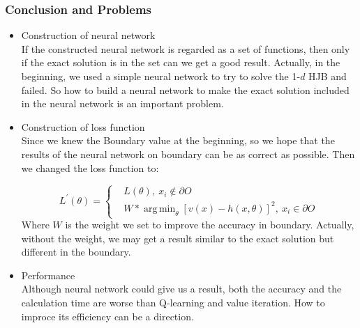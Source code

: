 \documentclass[11pt]{amsart}
\DeclareMathOperator*{\argminA}{arg\,min} %
\begin{document}
\subsubsection{Conclusion and Problems}
\begin{itemize}
 \item Construction of neural network\\
If the constructed neural network is regarded as a set of functions, then only if the exact solution is in the set can we get a good result. Actually, in the beginning, we used a simple neural network to try to solve the 1-$d$ HJB and failed. So how to build a neural network to make the exact solution included in the neural network is an important problem.
 \item Construction of loss function\\
Since we knew the Boundary value at the beginning, so we hope that the results of the neural network on boundary can be as correct as possible. Then we changed the loss function to:

$$ L^{'}(\theta) =\left\{
\begin{aligned}
&L(\theta),\ x_i  \notin \partial O\\
&W*\argminA_\theta [v(x)-h(x,\theta)]^2 ,\ x_i \in \partial O
\end{aligned}
\right.
$$
Where $W$ is the weight we set to improve the accuracy in boundary. Actually, without the weight, we may get a result similar to the exact solution but different in the boundary.
 \item Performance\\
Although neural network could give us a result, both the accuracy and the calculation time are worse than Q-learning and value iteration. How to improce its efficiency can be a direction.
\end{itemize}
\end{document}
